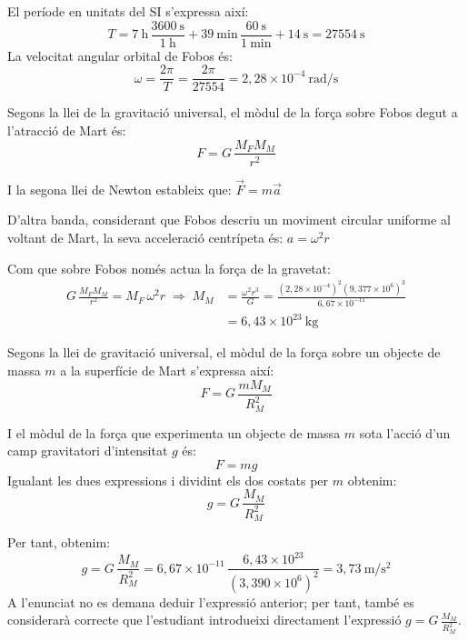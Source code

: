 \begin{solapartat}
 El període en unitats del SI s'expressa així:
\[ T = 7\ \mathrm{h}\,\frac{3600\ \mathrm{s}}{1\ \mathrm{h}} + 39\ \mathrm{min}\,\frac{60\ \mathrm{s}}{1\ \mathrm{min}} + 14\ \mathrm{s} = 27554\ \mathrm{s} \]
La velocitat angular orbital de Fobos és:
\[ \omega = \frac{2\pi}{T} = \frac{2\pi}{27554} = 2,28\times 10^{-4}\ \mathrm{rad/s} \]

 Segons la llei de la gravitació universal, el mòdul de la força sobre Fobos degut a l'atracció de Mart és:
\[ F = G\,\frac{M_F M_M}{r^2} \]

 I la segona llei de Newton estableix que: $\vec{F} = m\vec{a}$

 D'altra banda, considerant que Fobos descriu un moviment circular uniforme al voltant de Mart, la seva acceleració centrípeta és: $a = \omega^2 r$

 Com que sobre Fobos només actua la força de la gravetat:
\begin{align*}
G\,\frac{M_F M_M}{r^2} = M_F\,\omega^2 r \;\Rightarrow\; M_M &= \frac{\omega^2 r^3}{G} = \frac{(2,28\times 10^{-4})^2(9,377\times 10^{6})^3}{6,67\times 10^{-11}}\\
&= 6,43\times 10^{23}\ \mathrm{kg}
\end{align*}

 Segons la llei de gravitació universal, el mòdul de la força sobre un objecte de massa $m$ a la superfície de Mart s'expressa així:
\[ F = G\,\frac{m M_M}{R_M^2} \]

 I el mòdul de la força que experimenta un objecte de massa $m$ sota l'acció d'un camp gravitatori d'intensitat $g$ és:
\[ F = mg \]
Igualant les dues expressions i dividint els dos costats per $m$ obtenim:
\[ g = G\,\frac{M_M}{R_M^2} \]

 Per tant, obtenim:
\[ g = G\,\frac{M_M}{R_M^2} = 6,67\times 10^{-11}\,\frac{6,43\times 10^{23}}{(3,390\times 10^{6})^2} = 3,73\ \mathrm{m/s^2} \]
A l'enunciat no es demana deduir l'expressió anterior; per tant, també es considerarà correcte que l'estudiant introdueixi directament l'expressió $g = G\,\frac{M_M}{R_M^2}$.
\end{solapartat}

